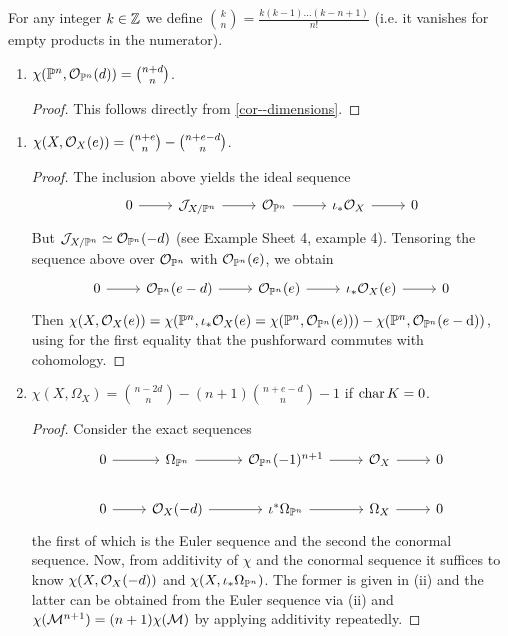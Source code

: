\documentclass[a4paper,11pt]{article}
\begin{document}
			\begin{eg}
				For any integer $k\in\Z$ we define $\binom{k}{n}=\frac{k(k-1)\dots(k-n+1)}{n!}$ (i.e. it vanishes for empty products in the numerator).
				\begin{enumerate}
					\item $\chi(\P^n,\O_{\P^n}(d))=\binom{n+d}{n}$.
						\begin{proof}
							This follows directly from \autoref{cor--dimensions}.
						\end{proof}
				\end{enumerate}
				\begin{enumerate}
					\item $\chi(X,\O_X(e))=\binom{n+e}{n}-\binom{n+e-d}{n}$. 
						\begin{proof}
							The inclusion above yields the ideal sequence
							\begin{equation*}
								\begin{tikzcd}
									0\ar[r] & \J_{X/\P^n}\ar[r] & \O_{\P^n}\ar[r] & \iota_\ast\O_X\ar[r] & 0
								\end{tikzcd}
							\end{equation*}
							But $\J_{X/\P^n}\simeq\O_{\P^n}(-d)$ (see Example Sheet 4, example 4). Tensoring the sequence above over $\O_{\P^n}$ with $\O_{\P^n}(e)$, we obtain
							\begin{equation*}
								\begin{tikzcd}
									0\ar[r] & \O_{\P^n}(e-d)\ar[r] & \O_{\P^n}(e)\ar[r] & \iota_\ast\O_X(e)\ar[r] & 0
								\end{tikzcd}
							\end{equation*} 
							Then $\chi(X,\O_X(e))=\chi(\P^n,\iota_\ast\O_X(e)=\chi(\P^n,\O_{\P^n}(e)))-\chi(\P^n,\O_{\P^n}(e-\mathrm{d}))$, using for the first equality that the pushforward commutes with cohomology.
						\end{proof}
					\item $\chi(X,\Omega_X)=\binom{n-2d}{n}-(n+1)\binom{n+e-d}{n}-1$ if $\Char K=0$.
						\begin{proof}
							Consider the exact sequences
							\begin{equation*}
								\begin{tikzcd}
									0\ar[r] & \Omega_{\P^n}\ar[r] & \O_{\P^n}(-1)^{n+1}\ar[r] & \O_X\ar[r] & 0\\
									0\ar[r] & \O_X(-d)\ar[r] & \iota^\ast\Omega_{\P^n}\ar[r] & \Omega_X\ar[r] & 0
								\end{tikzcd}
							\end{equation*}	
							the first of which is the Euler sequence and the second the conormal sequence. Now, from additivity of $\chi$ and the conormal sequence it suffices to know $\chi(X,\O_X(-d))$ and $\chi(X,\iota_\ast\Omega_{\P^n})$. The former is given in (ii) and the latter can be obtained from the Euler sequence via (ii) and $\chi(\M^{n+1})=(n+1)\chi(\M)$ by applying additivity repeatedly. 	
						\end{proof}
				\end{enumerate}
			\end{eg}
\end{document}
